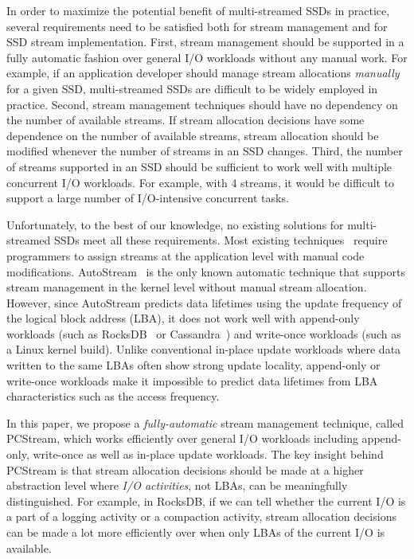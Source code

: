 In order to maximize the potential benefit of multi-streamed SSDs in practice,
several requirements need to be satisfied both for stream management and for
SSD stream implementation.  First, stream management should be supported in a
fully automatic fashion over general I/O workloads without any manual work.
For example, if an application developer should manage stream allocations {\it
manually} for a given SSD, multi-streamed SSDs are difficult to be widely
employed in practice.   Second, stream management techniques should have no
dependency on the number of available streams.  If stream allocation decisions
have some dependence on the number of available streams,  stream allocation
should be modified whenever the number of streams in an SSD changes.  Third,
the number of streams supported in an SSD should be sufficient to work well
with multiple concurrent I/O workloads.  For example, with 4 streams, it would
be difficult to support a large number of I/O-intensive concurrent tasks.  

Unfortunately, to the best of our knowledge, no existing solutions  for
multi-streamed SSDs meet all these requirements.  Most existing
techniques~\cite{MultiStream, Level, vStream, FStream} require programmers to
assign streams at the application level with manual code modifications.
\textsf{\small AutoStream}~\cite{AutoStream} is the only known automatic
technique that supports stream management in the kernel level without manual
stream allocation.  However, since \textsf{\small AutoStream} predicts data
lifetimes using the update frequency of the logical block address (LBA), it
does not work well with append-only workloads (such as
RocksDB~\cite{RocksDB} or Cassandra~\cite{Cassandra})
and write-once workloads (such as a Linux kernel build).  Unlike conventional
in-place update workloads where data written to the same LBAs often show strong update
locality, append-only or write-once workloads make it impossible to predict data lifetimes
from LBA characteristics such as the access frequency.

In this paper, we propose a {\it fully-automatic} stream management technique,
called \textsf{\small PCStream}, which works efficiently over general I/O
workloads including append-only, write-once as well as in-place update workloads.   
The key insight behind
\textsf{\small PCStream} is that stream allocation decisions should be made at
a higher abstraction level where {\it I/O activities}, not LBAs, can be
meaningfully distinguished.  For example, in RocksDB, if we can tell whether
the current I/O is a part of a logging activity or a compaction activity, stream
allocation decisions can be made a lot more efficiently over when only LBAs of
the current I/O is available.   

